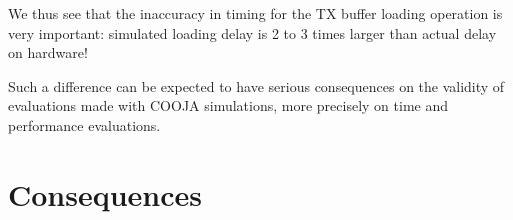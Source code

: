 \documentclass[a4paper,10pt]{article}
\begin{document}
We thus see that the inaccuracy in timing for the TX buffer loading operation
is very important: simulated loading delay is 2 to 3 times larger than
actual delay on hardware!

Such a difference can be expected to have serious consequences on
the validity of evaluations made with COOJA simulations, more precisely
on time and performance evaluations.


\section{Consequences}






\vfill

{\small
}
\end{document}

